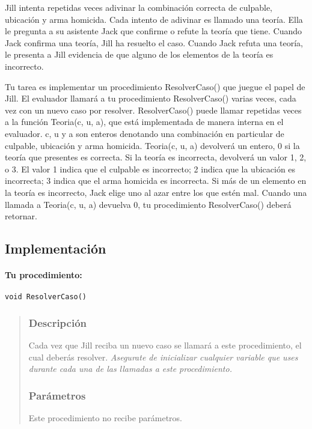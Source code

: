 Jill intenta repetidas veces adivinar la combinación correcta de culpable, ubicación y arma homicida. Cada intento de adivinar es llamado una teoría. Ella le pregunta a su asistente Jack que confirme o refute la teoría que tiene. Cuando Jack confirma una teoría, Jill ha resuelto el caso. Cuando Jack refuta una teoría, le presenta a Jill evidencia de que alguno de los elementos de la teoría es incorrecto.

Tu tarea es implementar un procedimiento ResolverCaso() que juegue el papel de Jill. El evaluador llamará a tu procedimiento ResolverCaso() varias veces, cada vez con un nuevo caso por resolver. ResolverCaso() puede llamar repetidas veces a la función Teoria(c, u, a), que está implementada de manera interna en el evaluador. c, u y a son enteros denotando una combinación en particular de culpable, ubicación y arma homicida. Teoria(c, u, a) devolverá un entero, 0 si la teoría que presentes es correcta. Si la teoría es incorrecta, devolverá un valor 1, 2, o 3. El valor 1 indica que el culpable es incorrecto; 2 indica que la ubicación es incorrecta; 3 indica que el arma homicida es incorrecta. Si más de un elemento en la teoría es incorrecto, Jack elige uno al azar entre los que estén mal. Cuando una llamada a Teoria(c, u, a) devuelva 0, tu procedimiento ResolverCaso() deberá retornar.

\subsection*{Implementación}
\paragraph{Tu procedimiento:} \verb|void ResolverCaso()|
\begin{quotation}
	
\subsubsection*{Descripción}

Cada vez que Jill reciba un nuevo caso se llamará a este procedimiento, el cual deberás resolver. \textit{Asegurate de inicializar cualquier variable que uses durante cada una de las llamadas a este procedimiento.}

\subsubsection*{Parámetros}
\begin{plimits}
	\item Este procedimiento no recibe parámetros.
\end{plimits}
\end{quotation}

